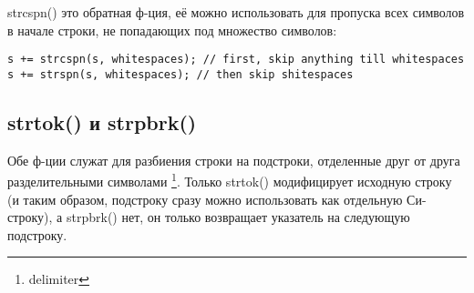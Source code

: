 strcspn() это обратная ф-ция, её можно использовать для пропуска всех символов в начале строки, не попадающих
под множество символов:

\begin{lstlisting}
s += strcspn(s, whitespaces); // first, skip anything till whitespaces
s += strspn(s, whitespaces); // then skip shitespaces
\end{lstlisting}

\subsection{strtok() и strpbrk()}

Обе ф-ции служат для разбиения строки на подстроки, отделенные друг от друга разделительными символами
\footnote{delimiter}.
Только strtok() модифицирует исходную строку (и таким образом, подстроку сразу можно использовать
как отдельную Си-строку), а strpbrk() нет, он только возвращает указатель на следующую подстроку.

